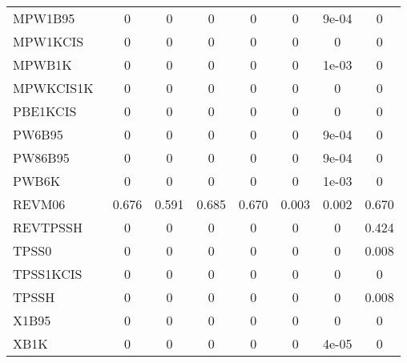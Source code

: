 \begin{table*}
\begin{tabular}{|l|c|c|c|c|c|c|c|}
MPW1B95~\cite{Zhao2004_6908} & 0 & 0 & 0 & 0 & 0 & 9e-04 & 0 \\
MPW1KCIS~\cite{Zhao2005_2012} & 0 & 0 & 0 & 0 & 0 & 0 & 0 \\
MPWB1K~\cite{Zhao2004_6908} & 0 & 0 & 0 & 0 & 0 & 1e-03 & 0 \\
MPWKCIS1K~\cite{Zhao2005_2012} & 0 & 0 & 0 & 0 & 0 & 0 & 0 \\
PBE1KCIS~\cite{Zhao2005_415} & 0 & 0 & 0 & 0 & 0 & 0 & 0 \\
PW6B95~\cite{Zhao2005_5656} & 0 & 0 & 0 & 0 & 0 & 9e-04 & 0 \\
PW86B95~\cite{Becke1996_1040} & 0 & 0 & 0 & 0 & 0 & 9e-04 & 0 \\
PWB6K~\cite{Zhao2005_5656} & 0 & 0 & 0 & 0 & 0 & 1e-03 & 0 \\
REVM06~\cite{Wang2018_10257} & 0.676 & 0.591 & 0.685 & 0.670 & 0.003 & 0.002 & 0.670 \\
REVTPSSH~\cite{Csonka2010_3688} & 0 & 0 & 0 & 0 & 0 & 0 & 0.424 \\
TPSS0~\cite{Grimme2005_3067} & 0 & 0 & 0 & 0 & 0 & 0 & 0.008 \\
TPSS1KCIS~\cite{Zhao2005_43} & 0 & 0 & 0 & 0 & 0 & 0 & 0 \\
TPSSH~\cite{Staroverov2003_12129} & 0 & 0 & 0 & 0 & 0 & 0 & 0.008 \\
X1B95~\cite{Zhao2004_6908} & 0 & 0 & 0 & 0 & 0 & 0 & 0 \\
XB1K~\cite{Zhao2004_6908} & 0 & 0 & 0 & 0 & 0 & 4e-05 & 0 \\
\bottomrule
\end{tabular}
\end{table*}
